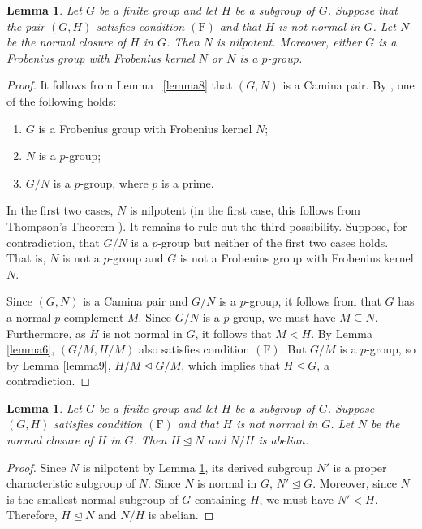 \documentclass[twoside,a4paper,reqno,11pt]{amsart}
\newcommand{\<}{\langle}
\renewcommand{\>}{\rangle}
\newcommand{\F}{\mathrm{(F)}}
\renewcommand{\:}{\colon}
\newtheorem{lem}[thm]{Lemma}
\theoremstyle{definition}
\begin{document}
\begin{lem}\label{lemma12}
Let $G$ be a finite group and let $H$ be a subgroup of $G$.	Suppose that the pair $(G,H)$ satisfies condition $\F$ and that $H$ is not normal in $G$. Let $N$ be the normal closure of $H$ in $G$. Then $N$ is nilpotent. Moreover, either $G$ is a Frobenius group with Frobenius kernel $N$ or $N$ is a $p$-group. 
\end{lem}
\begin{proof}
It follows from Lemma~ \ref{lemma8} that $(G,N)$ is a Camina pair. By \cite[Theorem 2]{Camina}, one of the following holds: 
	\begin{enumerate}
\item	$G$ is a Frobenius group with Frobenius kernel $N$; 
\item  $N$ is a $p$-group; 
\item  $G/N$ is a $p$-group, where $p$ is a prime. 
\end{enumerate} 

In the first two cases, $N$ is nilpotent (in the first case, this follows from Thompson's Theorem \cite[Theorem 1]{Thompson}). It remains to rule out the third possibility. Suppose, for contradiction, that  $G/N$ is a $p$-group but neither of the first two cases holds. That is, $N$ is not a $p$-group and $G$ is not a Frobenius group with Frobenius kernel $N$.  
	
Since $(G,N)$ is a Camina pair and $G/N$ is a $p$-group, it follows from \cite[Theorem 4.13]{Lewis} that  $G$ has a normal $p$-complement $M$. Since $G/N$ is a $p$-group,  we must have $M\subseteq N$. Furthermore, as $H$ is not normal in $G$, it follows that $M<H$. By Lemma \ref{lemma6}, $(G/M, H/M)$ also satisfies condition $\F$. But $G/M$ is a $p$-group, so  by Lemma \ref{lemma9}, $H/M\unlhd G/M$, which implies that $H\unlhd G$, a contradiction.
\end{proof}


\begin{lem}\label{lemma13}
Let $G$ be a finite group and let $H$ be a subgroup of $G$.	Suppose $(G,H)$ satisfies condition $\F$ and that $H$ is not normal in $G$. Let $N$ be the normal closure of $H$ in $G$. Then $H\unlhd N$ and $N/H$ is abelian. 
\end{lem}
\begin{proof}
	Since $N$ is nilpotent by Lemma \ref{lemma12}, its derived subgroup $N'$ is a proper characteristic subgroup of $N$. Since $N$ is normal in $G$, $N'\unlhd G$. Moreover, since $N$ is the smallest normal subgroup of $G$ containing $H$, we must have $N'<H$. Therefore, $H\unlhd N$ and $N/H$ is abelian.   
\end{proof}
\end{document}
